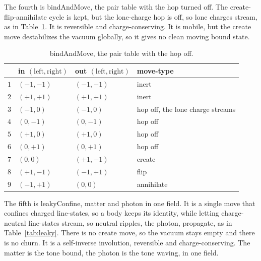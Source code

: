 The fourth is bindAndMove, the pair table with the hop turned off. The create-flip-annihilate cycle is kept, but the lone-charge hop is off, so lone charges stream, as in Table~\ref{tab:bindmove}. It is reversible and charge-conserving. It is mobile, but the create move destabilizes the vacuum globally, so it gives no clean moving bound state.

\begin{table}[ht]
\centering
\begin{tabular}{@{}llll@{}}
\toprule
 & in $(\text{left}, \text{right})$ & out $(\text{left}, \text{right})$ & move-type \\
\midrule
$1$ & $(-1,-1)$ & $(-1,-1)$ & inert \\
$2$ & $(+1,+1)$ & $(+1,+1)$ & inert \\
$3$ & $(-1,0)$ & $(-1,0)$ & hop off, the lone charge streams \\
$4$ & $(0,-1)$ & $(0,-1)$ & hop off \\
$5$ & $(+1,0)$ & $(+1,0)$ & hop off \\
$6$ & $(0,+1)$ & $(0,+1)$ & hop off \\
$7$ & $(0,0)$ & $(+1,-1)$ & create \\
$8$ & $(+1,-1)$ & $(-1,+1)$ & flip \\
$9$ & $(-1,+1)$ & $(0,0)$ & annihilate \\
\bottomrule
\end{tabular}
\caption{bindAndMove, the pair table with the hop off.}
\label{tab:bindmove}
\end{table}

The fifth is leakyConfine, matter and photon in one field. It is a single move that confines charged line-states, so a body keeps its identity, while letting charge-neutral line-states stream, so neutral ripples, the photon, propagate, as in Table~\ref{tab:leaky}. There is no create move, so the vacuum stays empty and there is no churn. It is a self-inverse involution, reversible and charge-conserving. The matter is the tone bound, the photon is the tone waving, in one field.

